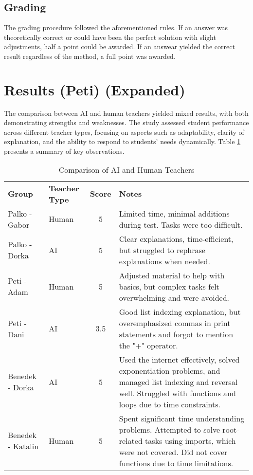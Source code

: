 \documentclass[12pt]{article}  %
\begin{document}
\subsection{Grading}
The grading procedure followed the aforementioned rules. If an answer was theoretically correct or could have been the perfect solution with slight adjustments, half a point could be awarded. If an answear yielded the correct result regardless of the method, a full point was awarded. 
\section{Results (Peti) (Expanded)}

The comparison between AI and human teachers yielded mixed results, with both demonstrating strengths and weaknesses. The study assessed student performance across different teacher types, focusing on aspects such as adaptability, clarity of explanation, and the ability to respond to students’ needs dynamically. Table \ref{tab:comparison} presents a summary of key observations.

\begin{table}[h]
\centering
\renewcommand{\arraystretch}{1.3}
\begin{tabular}{l l c p{7cm}}
\textbf{Group} & \textbf{Teacher Type} & \textbf{Score} & \textbf{Notes} \\
Palko - Gabor & Human & 5 & Limited time, minimal additions during test. Tasks were too difficult. \\
Palko - Dorka & AI & 5 & Clear explanations, time-efficient, but struggled to rephrase explanations when needed. \\
Peti - Adam & Human & 5 & Adjusted material to help with basics, but complex tasks felt overwhelming and were avoided. \\
Peti - Dani & AI & 3.5 & Good list indexing explanation, but overemphasized commas in print statements and forgot to mention the "+" operator. \\
Benedek - Dorka & AI & 5 & Used the internet effectively, solved exponentiation problems, and managed list indexing and reversal well. Struggled with functions and loops due to time constraints. \\
Benedek - Katalin & Human & 5 & Spent significant time understanding problems. Attempted to solve root-related tasks using imports, which were not covered. Did not cover functions due to time limitations. \\
\end{tabular}
\caption{Comparison of AI and Human Teachers}
\label{tab:comparison}
\end{table}
\end{document}
